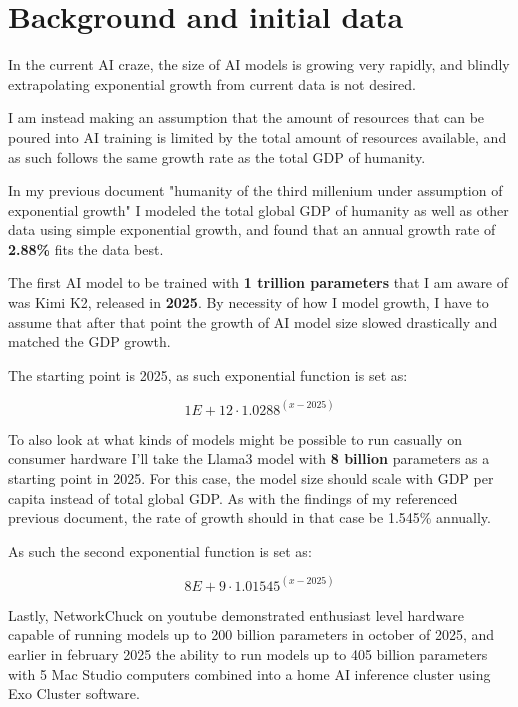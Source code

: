 \documentclass[a4paper]{article}
\begin{document}
	\tableofcontents
	
	\pagebreak
	
	\section{Background and initial data}
	
	In the current AI craze, the size of AI models is growing very rapidly, and blindly extrapolating exponential growth from current data is not desired.
	
	I am instead making an assumption that the amount of resources that can be poured into AI training is limited by the total amount of resources available, and as such follows the same growth rate as the total GDP of humanity.
	
	\medskip
	
	In my previous document "humanity of the third millenium under assumption of exponential growth" I modeled the total global GDP of humanity as well as other data using simple exponential growth, and found that an annual growth rate of \textbf{2.88\%} fits the data best.
	
	\medskip
	
	The first AI model to be trained with \textbf{1 trillion parameters} that I am aware of was Kimi K2, released in \textbf{2025}.
	By necessity of how I model growth, I have to assume that after that point the growth of AI model size slowed drastically and matched the GDP growth.
	
	\bigskip
	
	The starting point is 2025, as such exponential function is set as:
	
	$$ 1E+12 \cdot 1.0288^{(x-2025)} $$
	
	\bigskip
	
	To also look at what kinds of models might be possible to run casually on consumer hardware I'll take the Llama3 model with \textbf{8 billion} parameters as a starting point in 2025.
	For this case, the model size should scale with GDP per capita instead of total global GDP.
	As with the findings of my referenced previous document, the rate of growth should in that case be 1.545\% annually.
	
	\medskip
	
	As such the second exponential function is set as:
	
	$$ 8E+9 \cdot 1.01545^{(x-2025)} $$
	
	\medskip
	
	Lastly, NetworkChuck on youtube demonstrated enthusiast level hardware capable of running models up to 200 billion parameters in october of 2025, and earlier in february 2025 the ability to run models up to 405 billion parameters with 5 Mac Studio computers combined into a home AI inference cluster using Exo Cluster software.
	
\end{document}
